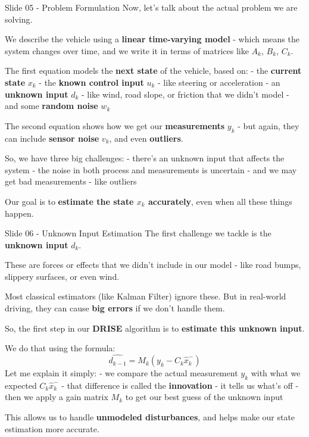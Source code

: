 \documentclass{beamer}
\begin{document}
\begin{frame}{Slide 05 - Problem Formulation}
\protect\hypertarget{slide-05---problem-formulation}{}
Now, let's talk about the actual problem we are solving.

We describe the vehicle using a \textbf{linear time-varying model} -
which means the system changes over time, and we write it in terms of
matrices like \(A_k\), \(B_k\), \(C_k\).

The first equation models the \textbf{next state} of the vehicle, based
on: - the \textbf{current state} \(x_k\) - the \textbf{known control
input} \(u_k\) - like steering or acceleration - an \textbf{unknown
input} \(d_k\) - like wind, road slope, or friction that we didn't model
- and some \textbf{random noise} \(w_k\)

The second equation shows how we get our \textbf{measurements} \(y_k\) -
but again, they can include \textbf{sensor noise} \(v_k\), and even
\textbf{outliers}.

So, we have three big challenges: - there's an unknown input that
affects the system - the noise in both process and measurements is
uncertain - and we may get bad measurements - like outliers

Our goal is to \textbf{estimate the state \(x_k\) accurately}, even when
all these things happen.
\end{frame}

\begin{frame}{Slide 06 - Unknown Input Estimation}
\protect\hypertarget{slide-06---unknown-input-estimation}{}
The first challenge we tackle is the \textbf{unknown input} \(d_k\).

These are forces or effects that we didn't include in our model - like
road bumps, slippery surfaces, or even wind.

Most classical estimators (like Kalman Filter) ignore these. But in
real-world driving, they can cause \textbf{big errors} if we don't
handle them.

So, the first step in our \textbf{DRISE} algorithm is to
\textbf{estimate this unknown input}.

We do that using the formula:
\[\hat{d_{k-1}} = M_k (y_k - C_k \hat{x}_k^-)\] Let me explain it
simply: - we compare the actual measurement \(y_k\) with what we
expected \(C_k \hat{x}_k^-\) - that difference is called the
\textbf{innovation} - it tells us what's off - then we apply a gain
matrix \(M_k\) to get our best guess of the unknown input

This allows us to handle \textbf{unmodeled disturbances}, and helps make
our state estimation more accurate.
\end{frame}
\end{document}
